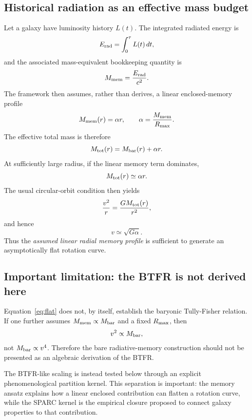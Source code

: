 \documentclass[twocolumn]{aastex631}
\begin{document}
\subsection{Historical radiation as an effective mass budget}
Let a galaxy have luminosity history $L(t)$. The integrated radiated energy is
\begin{equation}
E_{\rm rad}=\int_0^\tau L(t)\,dt,
\end{equation}
and the associated mass-equivalent bookkeeping quantity is
\begin{equation}
M_{\rm mem}=\frac{E_{\rm rad}}{c^2}.
\end{equation}
The framework then assumes, rather than derives, a linear enclosed-memory profile
\begin{equation}
M_{\rm mem}(r)=\alpha r,
\qquad
\alpha=\frac{M_{\rm mem}}{R_{\rm max}}.
\label{eq:memory}
\end{equation}
The effective total mass is therefore
\begin{equation}
M_{\rm tot}(r)=M_{\rm bar}(r)+\alpha r.
\end{equation}
At sufficiently large radius, if the linear memory term dominates,
\[
M_{\rm tot}(r)\simeq\alpha r.
\]
The usual circular-orbit condition then yields
\begin{equation}
\frac{v^2}{r}=\frac{GM_{\rm tot}(r)}{r^2},
\end{equation}
and hence
\begin{equation}
\boxed{v\simeq\sqrt{G\alpha}}.
\label{eq:flat}
\end{equation}
Thus the \emph{assumed linear radial memory profile} is sufficient to generate an asymptotically flat rotation curve.

\subsection{Important limitation: the BTFR is not derived here}
Equation~\eqref{eq:flat} does not, by itself, establish the baryonic Tully-Fisher relation. If one further assumes $M_{\rm mem}\propto M_{\rm bar}$ and a fixed $R_{\rm max}$, then
\[
v^2\propto M_{\rm bar},
\]
not $M_{\rm bar}\propto v^4$. Therefore the bare radiative-memory construction should not be presented as an algebraic derivation of the BTFR.

The BTFR-like scaling is instead tested below through an explicit phenomenological partition kernel. This separation is important: the memory ansatz explains how a linear enclosed contribution can flatten a rotation curve, while the SPARC kernel is the empirical closure proposed to connect galaxy properties to that contribution.
\end{document}
